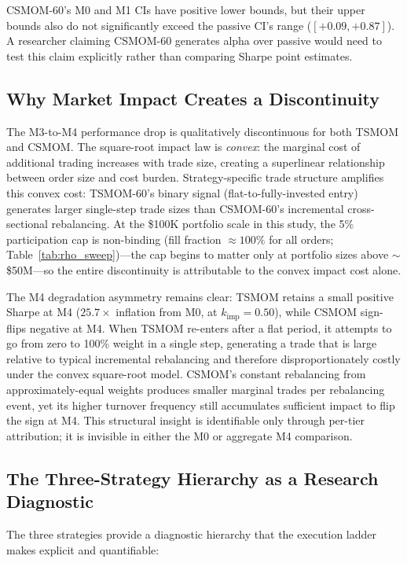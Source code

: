 \documentclass[12pt]{article}
\newcommand{\kimp}{k_{\mathrm{imp}}}
\begin{document}
CSMOM-60's M0 and M1 CIs have positive lower bounds, but
their upper bounds also do not significantly exceed the passive
CI's range ($[+0.09, +0.87]$). A researcher claiming CSMOM-60
generates alpha over passive would need to test this claim explicitly
rather than comparing Sharpe point estimates.

\subsection{Why Market Impact Creates a Discontinuity}
\label{sec:discontinuity}

The M3-to-M4 performance drop is qualitatively discontinuous
for both TSMOM and CSMOM. The square-root impact law is
\emph{convex}: the marginal cost of additional trading increases
with trade size, creating a superlinear relationship between
order size and cost burden. Strategy-specific trade structure
amplifies this convex cost: TSMOM-60's binary signal
(flat-to-fully-invested entry) generates larger single-step trade
sizes than CSMOM-60's incremental cross-sectional rebalancing.
At the \$100K portfolio scale in this study, the 5\% participation
cap is non-binding (fill fraction $\approx 100\%$ for all orders;
Table~\ref{tab:rho_sweep})---the cap begins to matter only at
portfolio sizes above $\sim$\$50M---so the
entire discontinuity is attributable to the convex impact cost alone.
\label{sec:discussion_cap}

The M4 degradation asymmetry remains clear: TSMOM retains a small
positive Sharpe at M4 ($25.7\times$ inflation from M0, at $\kimp=0.50$), while CSMOM
sign-flips negative at M4.
When TSMOM re-enters after a flat period, it attempts to go from
zero to 100\% weight in a single step, generating a trade that is
large relative to typical incremental rebalancing and therefore
disproportionately costly under the convex square-root model.
CSMOM's constant rebalancing from approximately-equal weights produces
smaller marginal trades per rebalancing event, yet its higher
turnover frequency still accumulates sufficient impact to flip the
sign at M4. This structural insight is identifiable only through
per-tier attribution; it is invisible in either the M0 or
aggregate M4 comparison.

\subsection{The Three-Strategy Hierarchy as a Research Diagnostic}
\label{sec:hierarchy}

The three strategies provide a diagnostic hierarchy that the execution
ladder makes explicit and quantifiable:
\end{document}
